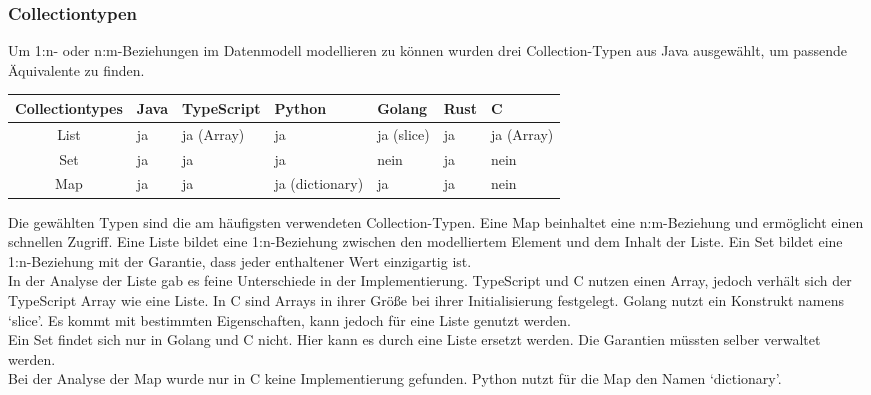 \documentclass[./einleitung.tex]{subfiles}
\begin{document}
    \subsubsection{Collectiontypen}
    Um 1:n- oder n:m-Beziehungen im Datenmodell modellieren zu können wurden drei Collection-Typen aus Java ausgewählt, um passende Äquivalente zu finden.
    \begin{center}
        \begin{tabular}{| c || m{3em} | m{4.5em} | m{5.5em} | m{4.5em} | m{3em} | m{4.5em} |}
            \hline
            Collectiontypes & Java & TypeScript & Python          & Golang     & Rust & C          \\
            \hline
            List            & ja   & ja (Array) & ja              & ja (slice) & ja   & ja (Array) \\
            \hline
            Set             & ja   & ja         & ja              & nein       & ja   & nein       \\
            \hline
            Map             & ja   & ja         & ja (dictionary) & ja         & ja   & nein       \\
            \hline

        \end{tabular}
    \end{center}
    Die gewählten Typen sind die am häufigsten verwendeten Collection-Typen.
    Eine Map beinhaltet eine n:m-Beziehung und ermöglicht einen schnellen Zugriff.
    Eine Liste bildet eine 1:n-Beziehung zwischen den modelliertem Element und dem Inhalt der Liste.
    Ein Set bildet eine 1:n-Beziehung mit der Garantie, dass jeder enthaltener Wert einzigartig ist. \\

    In der Analyse der Liste gab es feine Unterschiede in der Implementierung.
    TypeScript und C nutzen einen Array, jedoch verhält sich der TypeScript Array wie eine Liste.
    In C sind Arrays in ihrer Größe bei ihrer Initialisierung festgelegt.
    Golang nutzt ein Konstrukt namens `slice'.
    Es kommt mit bestimmten Eigenschaften, kann jedoch für eine Liste genutzt werden. \\

    Ein Set findet sich nur in Golang und C nicht.
    Hier kann es durch eine Liste ersetzt werden.
    Die Garantien müssten selber verwaltet werden. \\

    Bei der Analyse der Map wurde nur in C keine Implementierung gefunden.
    Python nutzt für die Map den Namen `dictionary'.
\end{document}

